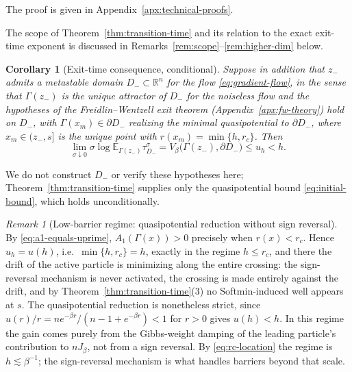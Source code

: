 \documentclass{article}
\theoremstyle{plain}
\newtheorem{corollary}[theorem]{Corollary}
\theoremstyle{definition}
\theoremstyle{remark}
\newtheorem{remark}[theorem]{Remark}
\newcommand{\prefactor}[2]{A_{#1}(#2)}
\newcommand{\R}{\mathbb{R}}
\newcommand{\E}{\mathbb{E}}
\begin{document}
\noindent The proof is given in Appendix~\ref{apx:technical-proofs}.

The scope of Theorem~\ref{thm:transition-time} and its relation to the exact exit-time exponent is discussed in Remarks~\ref{rem:scope}--\ref{rem:higher-dim} below.

\begin{corollary}[Exit-time consequence, conditional]
\label{cor:exit-time-conditional}
Suppose in addition that $z_-$ admits a metastable domain $D_-\subset\R^n$ for the flow \eqref{eq:gradient-flow}, in the sense that $\Gamma(z_-)$ is the unique attractor of $D_-$ for the noiseless flow and the hypotheses of the Freidlin--Wentzell exit theorem (Appendix~\ref{apx:fw-theory}) hold on $D_-$, with $\Gamma(x_m)\in\partial D_-$ realizing the minimal quasipotential to $\partial D_-$, where $x_m\in(z_-,s]$ is the unique point with $r(x_m)=\min\{h,r_c\}$. Then
\[
    \lim_{\sigma\downarrow0}\sigma\log \E_{\Gamma(z_-)}\tau_{D_-}^\sigma
    =V_\beta\bigl(\Gamma(z_-),\partial D_-\bigr)\le u_h<h.
\]
\end{corollary}
We do not construct $D_-$ or verify these hypotheses here; Theorem~\ref{thm:transition-time} supplies only the quasipotential bound \eqref{eq:initial-bound}, which holds unconditionally.


\begin{remark}[Low-barrier regime: quasipotential reduction without sign reversal]
\label{rem:low-barrier}
By \eqref{eq:a1-equals-uprime}, $\prefactor{1}{\Gamma(x)}>0$ precisely when $r(x)<r_c$. Hence $u_h=u(h)$, i.e.\ $\min\{h,r_c\}=h$, exactly in the regime $h\le r_c$, and there the drift of the active particle is minimizing along the entire crossing: the sign-reversal mechanism is never activated, the crossing is made entirely against the drift, and by Theorem~\ref{thm:transition-time}(3) no Softmin-induced well appears at $s$. The quasipotential reduction is nonetheless strict, since $u(r)/r=ne^{-\beta r}/(n-1+e^{-\beta r})<1$ for $r>0$ gives $u(h)<h$. In this regime the gain comes purely from the Gibbs-weight damping of the leading particle's contribution to $nJ_\beta$, not from a sign reversal. By \eqref{eq:rc-location} the regime is $h\lesssim\beta^{-1}$; the sign-reversal mechanism is what handles barriers beyond that scale.
\end{remark}
\end{document}
